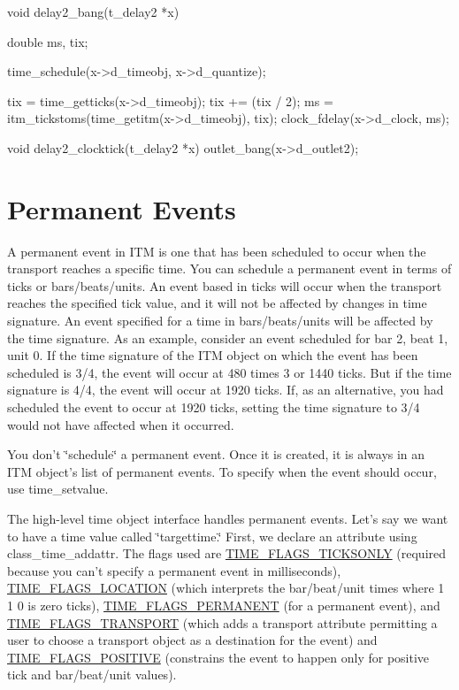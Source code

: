 \begin{DoxyCode}
    void delay2_bang(t_delay2 *x)
    {
        double ms, tix;
 
        time_schedule(x->d_timeobj, x->d_quantize);
 
        tix = time_getticks(x->d_timeobj);
        tix += (tix / 2);
        ms = itm_tickstoms(time_getitm(x->d_timeobj), tix);
        clock_fdelay(x->d_clock, ms);
    }
 
    void delay2_clocktick(t_delay2 *x)
    {
        outlet_bang(x->d_outlet2);
    }
\end{DoxyCode}
\hypertarget{chapter_itm_chapter_itm_permanent}{}\section{Permanent Events}\label{chapter_itm_chapter_itm_permanent}
A permanent event in ITM is one that has been scheduled to occur when the transport reaches a specific time. You can schedule a permanent event in terms of ticks or bars/beats/units. An event based in ticks will occur when the transport reaches the specified tick value, and it will not be affected by changes in time signature. An event specified for a time in bars/beats/units will be affected by the time signature. As an example, consider an event scheduled for bar 2, beat 1, unit 0. If the time signature of the ITM object on which the event has been scheduled is 3/4, the event will occur at 480 times 3 or 1440 ticks. But if the time signature is 4/4, the event will occur at 1920 ticks. If, as an alternative, you had scheduled the event to occur at 1920 ticks, setting the time signature to 3/4 would not have affected when it occurred.

You don't \char`\"{}schedule\char`\"{} a permanent event. Once it is created, it is always in an ITM object's list of permanent events. To specify when the event should occur, use time\_\-setvalue.

The high-\/level time object interface handles permanent events. Let's say we want to have a time value called \char`\"{}targettime.\char`\"{} First, we declare an attribute using class\_\-time\_\-addattr. The flags used are \hyperlink{group__time_gga99fb83031ce9923c84392b4e92f956b5af93981eb3922895394877d099323a2e8}{TIME\_\-FLAGS\_\-TICKSONLY} (required because you can't specify a permanent event in milliseconds), \hyperlink{group__time_gga99fb83031ce9923c84392b4e92f956b5ac80606ccbb9a16c14cf81874e4de2408}{TIME\_\-FLAGS\_\-LOCATION} (which interprets the bar/beat/unit times where 1 1 0 is zero ticks), \hyperlink{group__time_gga99fb83031ce9923c84392b4e92f956b5af2db490f1904d9f1e834f9ea062ad67e}{TIME\_\-FLAGS\_\-PERMANENT} (for a permanent event), and \hyperlink{group__time_gga99fb83031ce9923c84392b4e92f956b5a7ddd9e0fa3dc6a7b346fc3dcee5c5c81}{TIME\_\-FLAGS\_\-TRANSPORT} (which adds a transport attribute permitting a user to choose a transport object as a destination for the event) and \hyperlink{group__time_gga99fb83031ce9923c84392b4e92f956b5a4d4396aa4c56efec83245821ea888235}{TIME\_\-FLAGS\_\-POSITIVE} (constrains the event to happen only for positive tick and bar/beat/unit values).


